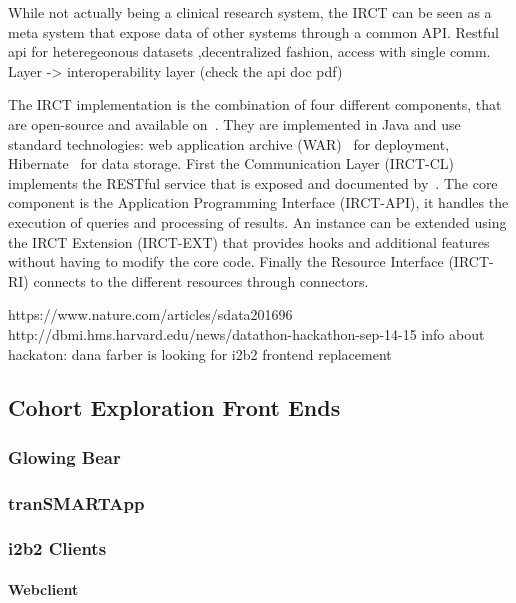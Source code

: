 While not actually being a clinical research system, the IRCT can be seen as a meta system that expose data of other systems through a common API.
Restful api for heteregeonous datasets ,decentralized fashion, access with single comm. Layer -> interoperability layer (check the api doc pdf)

The IRCT implementation is the combination of four different components, that are open-source and available on~\cite{IRCT-github}. They are implemented in Java and use standard technologies: web application archive (WAR)~\cite{wiki:war} for deployment, Hibernate~\cite{wiki:hibernate} for data storage.
First the Communication Layer (IRCT-CL) implements the RESTful service that is exposed and documented by~\cite{PIC-SURE-API}. 
The core component is the Application Programming Interface (IRCT-API), it handles the execution of queries and processing of results.
An instance can be extended using the IRCT Extension (IRCT-EXT) that provides hooks and additional features without having to modify the core code.
Finally the Resource Interface (IRCT-RI) connects to the different resources through connectors.


https://www.nature.com/articles/sdata201696
http://dbmi.hms.harvard.edu/news/datathon-hackathon-sep-14-15
info about hackaton: dana farber is looking for i2b2 frontend replacement 

\subsection{Cohort Exploration Front Ends}
\subsubsection{Glowing Bear}

\subsubsection{tranSMARTApp}


\subsubsection{i2b2 Clients}
\paragraph{Webclient}

